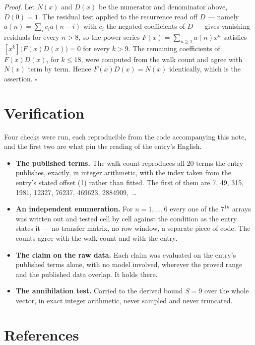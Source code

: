 \documentclass[11pt]{article}
\theoremstyle{definition}
\begin{document}
{\itshape Proof.} Let $N(x)$ and $D(x)$ be the numerator and denominator above, $D(0)=1$. The residual test applied to the recurrence read off $D$ --- namely $a(n) = \sum_i c_i a(n-i)$ with $c_i$ the negated coefficients of $D$ --- gives vanishing residuals for every $n > 8$, so the power series $F(x)=\sum_{n\ge 1}a(n)x^n$ satisfies $[x^k]\bigl(F(x)D(x)\bigr) = 0$ for every $k > 9$. The remaining coefficients of $F(x)D(x)$, for $k \le 18$, were computed from the walk count and agree with $N(x)$ term by term. Hence $F(x)D(x) = N(x)$ identically, which is the assertion. $\square$

\section{Verification}

Four checks were run, each reproducible from the code accompanying this note, and the first two are what pin the reading of the entry's English.

\begin{itemize}

\item {\bfseries The published terms.} The walk count reproduces all 20 terms the entry publishes, exactly, in integer arithmetic, with the index taken from the entry's stated offset (1) rather than fitted. The first of them are 7, 49, 315, 1981, 12327, 76237, 469623, 2884909,~\dots

\item {\bfseries An independent enumeration.} For $n = 1,\dots,6$ every one of the $7^{1n}$ arrays was written out and tested cell by cell against the condition as the entry states it --- no transfer matrix, no row window, a separate piece of code. The counts agree with the walk count and with the entry.

\item {\bfseries The claim on the raw data.} Each claim was evaluated on the entry's published terms alone, with no model involved, wherever the proved range and the published data overlap. It holds there.

\item {\bfseries The annihilation test.} Carried to the derived bound $S = 9$ over the whole vector, in exact integer arithmetic, never sampled and never truncated.

\end{itemize}

\section{References}
\end{document}
